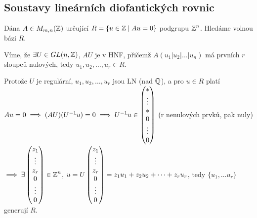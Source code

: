 \subsection{Soustavy lineárních diofantických rovnic}
Dána $A\in M_{m,n}(\operatorname{\mathbb{Z}})$ určující $R=\{u\in \operatorname{\mathbb{Z}}| \ Au=0\}$ podgrupu $\operatorname{\mathbb{Z}}^n$. Hledáme volnou bázi $R$.

Víme, že $\exists U\in GL(n,\operatorname{\mathbb{Z}})$, $AU$ je v HNF, přičemž 
$A(u_1|u_2|\ldots|u_n)$ má prvních $r$ sloupců nulových, tedy $u_1,u_2,\ldots,u_r\in R$. 

Protože $U$ je regulární, $u_1,u_2,\ldots,u_r$ jsou LN (nad $\operatorname{\mathbb{Q}}$), a pro $u\in R$ platí\\
$Au=0 \implies (AU)(U^{-1}u)=0\implies U^{-1}u\in \begin{pmatrix} * \\ \vdots \\ * \\ 0 \\ \vdots \\ 0 \end{pmatrix}$ (r nenulových prvků, pak nuly)\\ $\implies \exists\begin{pmatrix} z_1 \\ \vdots \\ z_r \\ 0 \\ \vdots \\ 0 \end{pmatrix}\in\operatorname{\mathbb{Z}}^n$, $u=U\begin{pmatrix} z_1 \\ \vdots \\ z_r \\ 0 \\ \vdots \\ 0 \end{pmatrix}=z_1u_1+z_2u_2+\cdots +z_ru_r$, tedy $\{u_1,\dots u_r\}$ generují $R$.

